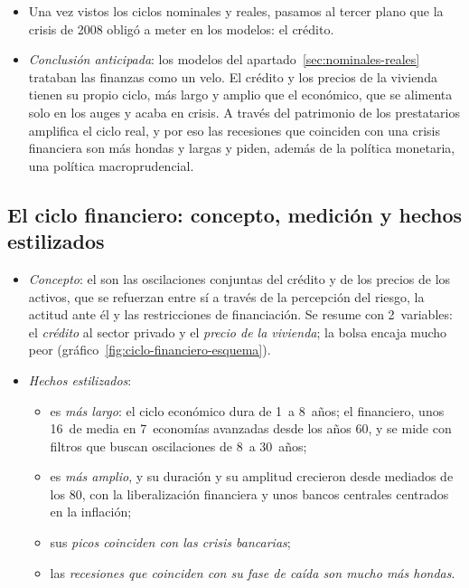 \documentclass[11pt]{article}
\begin{document}
\begin{itemize}
\item Una vez vistos los ciclos nominales y reales, pasamos al tercer plano que la crisis de 2008 obligó a meter en los modelos: el crédito.
\item \emph{Conclusión anticipada}: los modelos del apartado~\ref{sec:nominales-reales} trataban las finanzas como un velo. El crédito y los precios de la vivienda tienen su propio ciclo, más largo y amplio que el económico, que se alimenta solo en los auges y acaba en crisis. A través del patrimonio de los prestatarios amplifica el ciclo real, y por eso las recesiones que coinciden con una crisis financiera son más hondas y largas y piden, además de la política monetaria, una política macroprudencial.
\end{itemize}

\subsection{El ciclo financiero: concepto, medición y hechos estilizados}\label{sec:cf-hechos}

\begin{itemize}
\item \emph{Concepto}: el  son las oscilaciones conjuntas del crédito y de los precios de los activos, que se refuerzan entre sí a través de la percepción del riesgo, la actitud ante él y las restricciones de financiación\nocite{Borio2014Financial}. Se resume con 2~variables: el \emph{crédito} al sector privado y el \emph{precio de la vivienda}; la bolsa encaja mucho peor (gráfico~\ref{fig:ciclo-financiero-esquema}).
\item \emph{Hechos estilizados}\nocite{DrehmannBorioTsatsaronis2012,Borio2014Financial}:
  \begin{itemize}
  \item es \emph{más largo}: el ciclo económico dura de 1~a 8~años; el financiero, unos 16~de media en 7~economías avanzadas desde los años 60, y se mide con filtros que buscan oscilaciones de 8~a 30~años;
  \item es \emph{más amplio}, y su duración y su amplitud crecieron desde mediados de los 80, con la liberalización financiera y unos bancos centrales centrados en la inflación;
  \item sus \emph{picos coinciden con las crisis bancarias};
  \item las \emph{recesiones que coinciden con su fase de caída son mucho más hondas}\nocite{ClaessensKoseTerrones2012}.
  \end{itemize}
\end{itemize}
\end{document}
